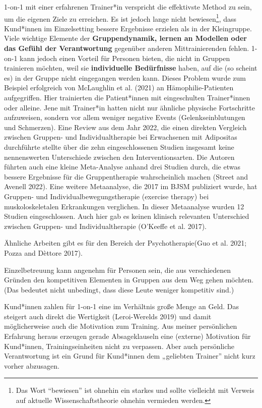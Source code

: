 \documentclass[
  letterpaper,
  DIV=11,
  numbers=noendperiod]{scrreprt}
\begin{document}
1-on-1 mit einer erfahrenen Trainer*in verspricht die effektivste Method
zu sein, um die eigenen Ziele zu erreichen. Es ist jedoch lange nicht
bewiesen\footnote{Das Wort ``bewiesen'' ist ohnehin ein starkes und
  sollte vielleicht mit Verweis auf aktuelle Wissenschaftstheorie
  ohnehin vermieden werden.}, dass Kund*innen im Einzelsetting bessere
Ergebnisse erzielen als in der Kleingruppe. Viele wichtige Elemente der
\textbf{Gruppendynamik, lernen an Modellen oder das Gefühl der
Verantwortung} gegenüber anderen Mittrainierenden fehlen. 1-on-1 kann
jedoch einen Vorteil für Personen bieten, die nicht in Gruppen
trainieren möchten, weil sie \textbf{individuelle Bedürfnisse} haben,
auf die (so scheint es) in der Gruppe nicht eingegangen werden kann.
Dieses Problem wurde zum Beispiel erfolgreich von McLaughlin et al.
(2021) an Hämophilie-Patienten aufgegriffen. Hier trainierten die
Patient*innen mit eingeschulten Trainer*innen oder alleine. Jene mit
Trainer*in hatten nicht nur ähnliche physische Fortschritte aufzuweisen,
sondern vor allem weniger negative Events (Gelenkseinblutungen und
Schmerzen). Eine Review aus dem Jahr 2022, die einen direkten Vergleich
zwischen Gruppen- und Individualtherapie bei Erwachsenen mit Adipositas
durchführte stellte über die zehn eingeschlossenen Studien insgesamt
keine nennenswerten Unterschiede zwischen den Interventionsarten. Die
Autoren führten auch eine kleine Meta-Analyse anhand drei Studien durch,
die etwas bessere Ergebnisse für die Gruppentherapie wahrscheinlich
machen (Street and Avenell 2022). Eine weitere Metaanalyse, die 2017 im
BJSM publiziert wurde, hat Gruppen- und Individualbewegungstherapie
(exercise therapy) bei muskoloskeletalen Erkrankungen verglichen. In
dieser Metaanalyse wurden 12 Studien eingeschlossen. Auch hier gab es
keinen klinisch relevanten Unterschied zwischen Gruppen- und
Individualtherapie (O'Keeffe et al. 2017).

Ähnliche Arbeiten gibt es für den Bereich der Psychotherapie(Guo et al.
2021; Pozza and Dèttore 2017).

Einzelbetreuung kann angenehm für Personen sein, die aus verschiedenen
Gründen den kompetitiven Elementen in Gruppen aus dem Weg gehen möchten.
(Das bedeutet nicht unbedingt, dass diese Leute weniger kompetitiv
sind.)

Kund*innen zahlen für 1-on-1 eine im Verhältnis große Menge an Geld. Das
steigert auch direkt die Wertigkeit (Leroi-Werelds 2019) und damit
möglicherweise auch die Motivation zum Training. Aus meiner persönlichen
Erfahrung heraus erzeugen gerade Absageklauseln eine (externe)
Motivation für Kund*innen, Trainingseinheiten nicht zu verpassen. Aber
auch persönliche Verantwortung ist ein Grund für Kund*innen dem
„geliebten Trainer'' nicht kurz vorher abzusagen.
\end{document}

